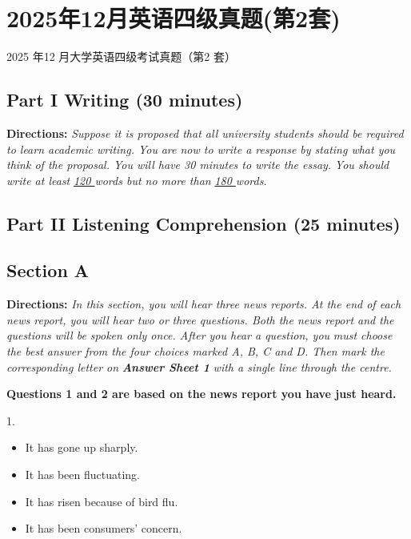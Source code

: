 \documentclass[UTF8,11pt]{ctexart}
\begin{document}
\section*{2025年12月英语四级真题(第2套)}
2025 年12 月大学英语四级考试真题（第2 套）


\subsection*{\textbf{Part I Writing} \textbf{(30 minutes)}}


\textbf{Directions:} \textit{Suppose it is proposed that all university students should be required to learn academic writing. You} \textit{are now to write a response by stating what you think of the proposal. You will have 30 minutes to write the essay.} \textit{You should write at least }\textit{\uline{120 }}\textit{words but no more than }\textit{\uline{180 }}\textit{words.}


\subsection*{\textbf{Part II} \textbf{Listening Comprehension} \textbf{(25 minutes)}}


\subsection*{\textbf{Section A}}


\textbf{Directions:} \textit{In this section, you will hear three news reports. At the end of each news report, you will hear two or} \textit{three questions. Both the news report and the questions will be spoken only once. After you hear a question, you} \textit{must choose the best answer from the four choices marked A, B, C and D. Then mark the corresponding letter on} \textbf{\textit{Answer Sheet 1}}\textit{ with a single line through the centre.}


\textbf{Questions 1 and 2 are based on the news report you have just heard.}


1.


\begin{itemize}[leftmargin=2em,itemsep=.2em,topsep=.4em]\item[A.] It has gone up sharply.
\item[B.] It has been fluctuating.
\item[C.] It has risen because of bird flu.
\item[D.] It has been consumers’ concern.
\end{itemize}
\end{document}
